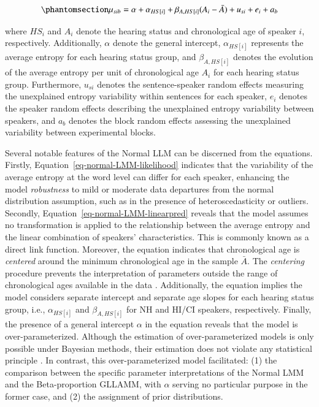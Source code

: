 \documentclass[
  authoryear,
  preprint,
  1p]{elsarticle}
\begin{document}
\begin{equation}\phantomsection\label{eq-normal-LMM-linearpred}{
\mu_{sib} = \alpha + \alpha_{HS[i]} + \beta_{A, HS[i]} (A_{i} - \bar{A}) + u_{si} + e_{i} + a_{b}
}\end{equation}

where \(HS_{i}\) and \(A_{i}\) denote the hearing status and
chronological age of speaker \(i\), respectively. Additionally,
\(\alpha\) denote the general intercept, \(\alpha_{HS[i]}\) represents
the average entropy for each hearing status group, and
\(\beta_{A,HS[i]}\) denotes the evolution of the average entropy per
unit of chronological age \(A_{i}\) for each hearing status group.
Furthermore, \(u_{si}\) denotes the sentence-speaker random effects
measuring the unexplained entropy variability within sentences for each
speaker, \(e_{i}\) denotes the speaker random effects describing the
unexplained entropy variability between speakers, and \(a_{b}\) denotes
the block random effects assessing the unexplained variability between
experimental blocks.

Several notable features of the Normal LLM can be discerned from the
equations. Firstly, Equation~\ref{eq-normal-LMM-likelihood} indicates
that the variability of the average entropy at the word level can differ
for each speaker, enhancing the model \emph{robustness} to mild or
moderate data departures from the normal distribution assumption, such
as in the presence of heteroscedasticity or outliers. {Secondly,
Equation~\ref{eq-normal-LMM-linearpred} reveals that the model assumes
no transformation is applied to the relationship between the average
entropy and the linear combination of speakers' characteristics. This is
commonly known as a direct link function. Moreover, the equation
indicates that chronological age is \emph{centered} around the minimum
chronological age in the sample \(\bar{A}\). The \emph{centering}
procedure prevents the interpretation of parameters outside the range of
chronological ages available in the data \citep{Everitt_et_al_2010}.
Additionally, the equation implies the model considers separate
intercept and separate age slopes for each hearing status group, i.e.,
\(\alpha_{HS[i]}\) and \(\beta_{A, HS[i]}\) for NH and HI/CI speakers,
respectively. Finally, the presence of a general intercept \(\alpha\) in
the equation reveals that the model is over-parameterized. Although the
estimation of over-parameterized models is only possible under Bayesian
methods, their estimation does not violate any statistical principle
\citep[345]{McElreath_2020}. In contrast, this over-parameterized model
facilitated: (1) the comparison between the specific parameter
interpretations of the Normal LMM and the Beta-proportion GLLAMM, with
\(\alpha\) serving no particular purpose in the former case, and (2) the
assignment of prior distributions.}
\end{document}
